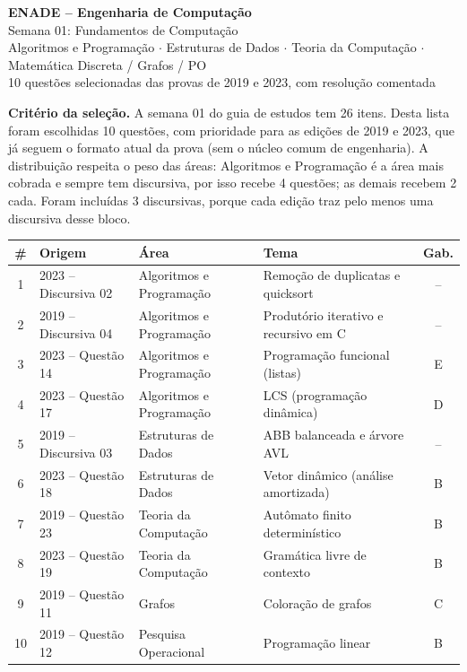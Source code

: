 \documentclass[11pt,a4paper]{article}
\begin{document}
\begin{center}
  {\LARGE\bfseries\color{azul} ENADE -- Engenharia de Computação}\\[4pt]
  {\Large Semana 01: Fundamentos de Computação}\\[4pt]
  {\normalsize Algoritmos e Programação $\cdot$ Estruturas de Dados $\cdot$
  Teoria da Computação $\cdot$ Matemática Discreta / Grafos / PO}\\[6pt]
  {\small 10 questões selecionadas das provas de 2019 e 2023, com resolução comentada}
\end{center}

\vspace{4pt}
\noindent\textbf{Critério da seleção.} A semana 01 do guia de estudos tem 26 itens.
Desta lista foram escolhidas 10 questões, com prioridade para as edições de 2019 e
2023, que já seguem o formato atual da prova (sem o núcleo comum de engenharia).
A distribuição respeita o peso das áreas: Algoritmos e Programação é a área mais
cobrada e sempre tem discursiva, por isso recebe 4 questões; as demais recebem 2 cada.
Foram incluídas 3 discursivas, porque cada edição traz pelo menos uma discursiva desse bloco.

\begin{center}
\small
\begin{tabular}{@{}clllc@{}}
\toprule
\textbf{\#} & \textbf{Origem} & \textbf{Área} & \textbf{Tema} & \textbf{Gab.}\\
\midrule
1  & 2023 -- Discursiva 02 & Algoritmos e Programação & Remoção de duplicatas e quicksort & --\\
2  & 2019 -- Discursiva 04 & Algoritmos e Programação & Produtório iterativo e recursivo em C & --\\
3  & 2023 -- Questão 14    & Algoritmos e Programação & Programação funcional (listas) & E\\
4  & 2023 -- Questão 17    & Algoritmos e Programação & LCS (programação dinâmica) & D\\
5  & 2019 -- Discursiva 03 & Estruturas de Dados      & ABB balanceada e árvore AVL & --\\
6  & 2023 -- Questão 18    & Estruturas de Dados      & Vetor dinâmico (análise amortizada) & B\\
7  & 2019 -- Questão 23    & Teoria da Computação     & Autômato finito determinístico & B\\
8  & 2023 -- Questão 19    & Teoria da Computação     & Gramática livre de contexto & B\\
9  & 2019 -- Questão 11    & Grafos                   & Coloração de grafos & C\\
10 & 2019 -- Questão 12    & Pesquisa Operacional     & Programação linear & B\\
\bottomrule
\end{tabular}
\end{center}
\end{document}
